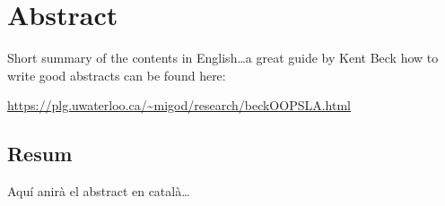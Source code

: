 \begingroup
\let\clearpage\relax
\let\cleardoublepage\relax
\let\cleardoublepage\relax

\chapter*{Abstract}
Short summary of the contents in English\dots a great guide by 
Kent Beck how to write good abstracts can be found here:  
\begin{center}
\url{https://plg.uwaterloo.ca/~migod/research/beckOOPSLA.html}
\end{center}

\vfill

\begin{otherlanguage}{catalan}
\chapter*{Resum}
Aquí anirà el abstract en català\dots 
\end{otherlanguage}

\endgroup			

\vfill
